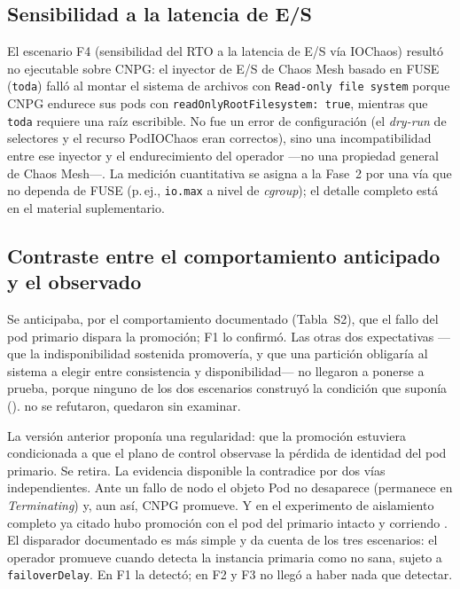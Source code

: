 \subsection{Sensibilidad a la latencia de E/S}\label{sec:io}
El escenario F4 (sensibilidad del RTO a la latencia de E/S vía IOChaos) resultó no ejecutable sobre CNPG: el inyector de E/S de Chaos Mesh basado en FUSE (\texttt{toda}) falló al montar el sistema de archivos con \texttt{Read-only file system} porque CNPG endurece sus pods con \texttt{readOnlyRootFilesystem: true}, mientras que \texttt{toda} requiere una raíz escribible. No fue un error de configuración (el \textit{dry-run} de selectores y el recurso PodIOChaos eran correctos), sino una incompatibilidad entre ese inyector y el endurecimiento del operador —no una propiedad general de Chaos Mesh—. La medición cuantitativa se asigna a la Fase~2 por una vía que no dependa de FUSE (p.\,ej., \texttt{io.max} a nivel de \textit{cgroup}); el detalle completo está en el material suplementario.

\subsection{Contraste entre el comportamiento anticipado y el observado}\label{sec:contraste}
Se anticipaba, por el comportamiento documentado (Tabla~S2), que el fallo del pod primario dispara la promoción; F1 lo confirmó. Las otras dos expectativas —que la indisponibilidad sostenida promovería, y que una partición obligaría al sistema a elegir entre consistencia y disponibilidad— no llegaron a ponerse a prueba, porque ninguno de los dos escenarios construyó la condición que suponía (). no se refutaron, quedaron sin examinar.

La versión anterior proponía una regularidad: que la promoción estuviera condicionada a que el plano de control observase la pérdida de identidad del pod primario. Se retira. La evidencia disponible la contradice por dos vías independientes. Ante un fallo de nodo el objeto Pod no desaparece  (permanece en \textit{Terminating}) y, aun así, CNPG promueve. Y en el experimento de aislamiento completo ya citado hubo promoción con el pod del primario intacto y corriendo \citep{sivko2026}. El disparador documentado es más simple y da cuenta de los tres escenarios: el operador promueve cuando detecta la instancia primaria como no sana, sujeto a \texttt{failoverDelay}. En F1 la detectó; en F2 y F3 no llegó a haber nada que detectar.

